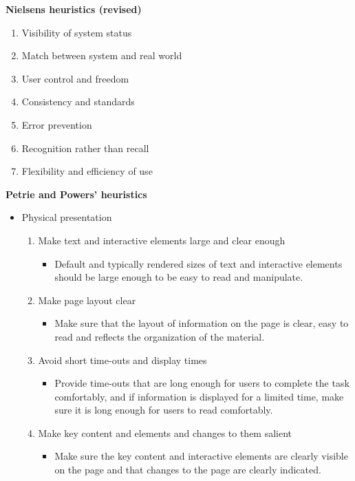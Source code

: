 \textbf{Nielsens heuristics (revised)}\\
\begin{enumerate}
	\item Visibility of system status
	\item Match between system and real world
	\item User control and freedom
	\item Consistency and standards
	\item Error prevention
	\item Recognition rather than recall
	\item Flexibility and efficiency of use
\end{enumerate}
\textbf{Petrie and Powers' heuristics}
\begin{itemize}
	\item Physical presentation
	\begin{enumerate}
		\item Make text and interactive elements large and clear enough
		\begin{itemize}
			\item Default and typically rendered sizes of text and interactive elements should be large enough to be easy to read and manipulate.
		\end{itemize}
		\item Make page layout clear
		\begin{itemize}
			\item Make sure that the layout of information on the page is clear, easy to read and reflects the organization of the material.
		\end{itemize}
		\item Avoid short time-outs and display times
		\begin{itemize}
			\item Provide time-outs that are long enough for users to complete the task comfortably, and if information is displayed for a limited time, make sure it is long enough for	users to read comfortably.
		\end{itemize}
		\item Make key content and elements and changes to them salient
		\begin{itemize}
			\item Make sure the key content and interactive elements are clearly visible on the page	and that changes to the page are clearly indicated.
		\end{itemize} 
	\end{enumerate}

\end{itemize}
